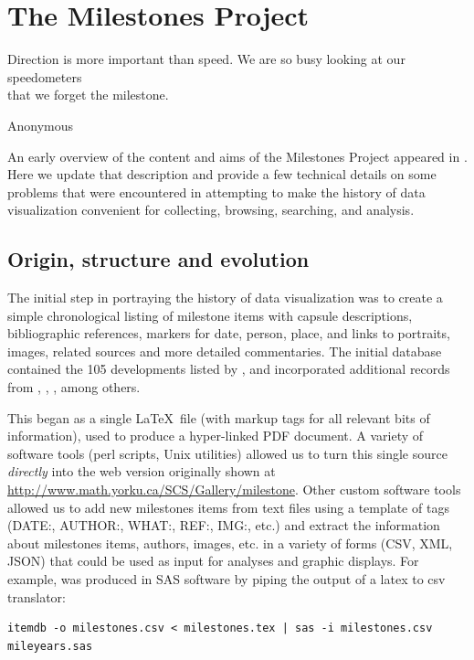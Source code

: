 \section{The Milestones Project}\label{sec:project}
\epigraph{Direction is more important than speed. We are so busy looking at our 
speedometers \\ that we forget the milestone.}{Anonymous} 

An early overview of the content and aims of the Milestones Project appeared in 
\cite{Friendly:04:gfkl}. 
Here we update that description and provide a few technical details on some 
problems that were encountered in attempting to make the history of data 
visualization convenient for collecting, browsing, searching, and analysis.

\subsection{Origin, structure and evolution}\label{sec:structure}
The initial step in portraying the history of data visualization was to create 
a simple chronological listing of milestone items with capsule descriptions, 
bibliographic references, markers for date, person, place, and links to 
portraits, images, related sources and more detailed commentaries. 
The initial 
database contained the 105 developments listed by \citet{BenigerRobyn:1978}, 
and incorporated additional records from \citet{Hankins:1999}, 
\citet{Tufte:1983,Tufte:1990,Tufte:1997}, \citet{Heiser:2000}, among others.

This began as a single \LaTeX\ file (with markup tags for all relevant bits of 
information), used to produce a hyper-linked PDF document.  
A variety of 
software tools (perl scripts, Unix utilities) allowed us to turn this single 
source \emph{directly} into the web version originally shown at
\url{http://www.math.yorku.ca/SCS/Gallery/milestone}.  
Other custom software 
tools allowed us to add new milestones items from text files using a template 
of tags (DATE:, AUTHOR:, WHAT:, REF:, IMG:, etc.) and extract the information 
about milestones items, authors, images, etc. in a variety of forms (CSV, XML, 
JSON) that could be used as input for analyses and graphic displays.  
For example,  was produced in SAS software by piping the 
output of a latex to csv translator:
\begin{verbatim} 
itemdb -o milestones.csv < milestones.tex | sas -i milestones.csv mileyears.sas 
\end{verbatim}

